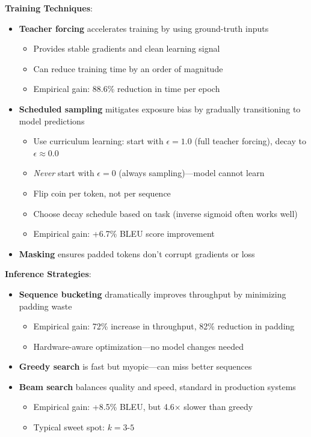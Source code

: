 \documentclass{article}
\begin{document}
\textbf{Training Techniques}:
\begin{itemize}
\item \textbf{Teacher forcing} accelerates training by using ground-truth inputs
\begin{itemize}
\item Provides stable gradients and clean learning signal
\item Can reduce training time by an order of magnitude
\item Empirical gain: 88.6\% reduction in time per epoch
\end{itemize}
\item \textbf{Scheduled sampling} mitigates exposure bias by gradually transitioning to model predictions
\begin{itemize}
\item Use curriculum learning: start with $\epsilon=1.0$ (full teacher forcing), decay to $\epsilon \approx 0.0$
\item \textit{Never} start with $\epsilon=0$ (always sampling)—model cannot learn
\item Flip coin per token, not per sequence
\item Choose decay schedule based on task (inverse sigmoid often works well)
\item Empirical gain: +6.7\% BLEU score improvement
\end{itemize}
\item \textbf{Masking} ensures padded tokens don't corrupt gradients or loss
\end{itemize}

\textbf{Inference Strategies}:
\begin{itemize}
\item \textbf{Sequence bucketing} dramatically improves throughput by minimizing padding waste
\begin{itemize}
\item Empirical gain: 72\% increase in throughput, 82\% reduction in padding
\item Hardware-aware optimization—no model changes needed
\end{itemize}
\item \textbf{Greedy search} is fast but myopic—can miss better sequences
\item \textbf{Beam search} balances quality and speed, standard in production systems
\begin{itemize}
\item Empirical gain: +8.5\% BLEU, but 4.6× slower than greedy
\item Typical sweet spot: $k=3$-$5$
\end{itemize}
\end{itemize}
\end{document}
